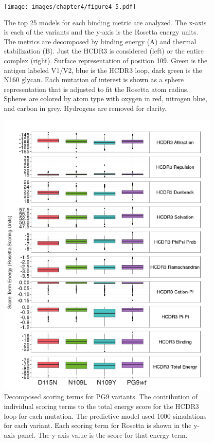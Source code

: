 \begin{figure}[!t]
   \centering
   \texttt{[image: images/chapter4/figure4\_5.pdf]} %
   \caption[Predictive Models of PG9 Variants that Enhanced Binding]{The top 25 models for each binding metric are analyzed. The x-axis is each of the variants and the y-axis is the Rosetta energy units. The metrics are decomposed by binding energy (A) and thermal stabilization (B). Just the HCDR3 is considered (left) or the entire complex (right). Surface representation of position 109. Green is the antigen labeled V1/V2, blue is the HCDR3 loop, dark green is the N160 glycan. Each mutation of interest is shown as a sphere representation that is adjusted to fit the Rosetta atom radius. Spheres are colored by atom type with oxygen in red, nitrogen blue, and carbon in grey. Hydrogens are removed for clarity.}
   \label{fig:figure4_5}
\end{figure} 


\begin{figure}[!t]
   \centering
   \includegraphics[scale=1.4]{images/chapter4/figure4_6.pdf} %
   \caption[Decomposed Scoring Terms for PG9 Variants]{Decomposed scoring terms for PG9 variants. The contribution of individual scoring terms to the total energy score for the HCDR3 loop for each mutation. The predictive model used 1000 simulations for each variant. Each scoring term for Rosetta is shown in the y-axis panel. The y-axis value is the score for that energy term.}
   \label{fig:figure4_6}
\end{figure} 


